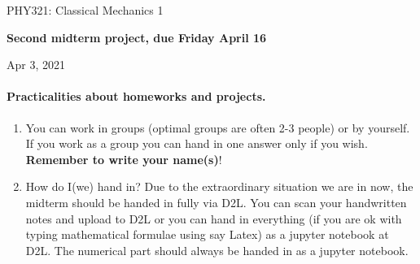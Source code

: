 \documentclass[%
oneside,                 %
final,                   %
10pt]{article}
\begin{document}

\newcommand{\exercisesection}[1]{\subsection*{#1}}






\thispagestyle{empty}

\begin{center}
{\LARGE\bf
\begin{spacing}{1.25}
PHY321: Classical Mechanics 1
\end{spacing}
}
\end{center}


\begin{center}
{\bf Second midterm project, due Friday April 16${}^{}$} \\ [0mm]
\end{center}

\begin{center}
\end{center}
    

\begin{center}
Apr 3, 2021
\end{center}

\vspace{1cm}


\paragraph{Practicalities about  homeworks and projects.}
\begin{enumerate}
\item You can work in groups (optimal groups are often 2-3 people) or by yourself. If you work as a group you can hand in one answer only if you wish. \textbf{Remember to write your name(s)}!

\item How do I(we)  hand in?  Due to the extraordinary situation we are in now, the midterm should be handed in fully via D2L. You can scan your handwritten notes and upload to D2L or you can hand in everything (if you are ok with typing mathematical formulae using say Latex) as a jupyter notebook at D2L. The numerical part should always be handed in as a jupyter notebook.
\end{enumerate}
\end{document}

